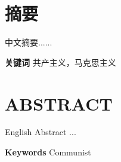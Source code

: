 \setcounter{page}{2}
\setcounter{secnumdepth}{-1}
\chapter{摘要}
中文摘要......

\vskip 0.5cm
\noindent{}\textbf{关键词}\quad{}
共产主义，马克思主义

\newpage
\chapter{ABSTRACT}
English Abstract ...

\vskip 0.5cm
\noindent{}\textbf{Keywords}\quad{}
Communist

\setcounter{secnumdepth}{3}
\newpage
\pagestyle{contents}